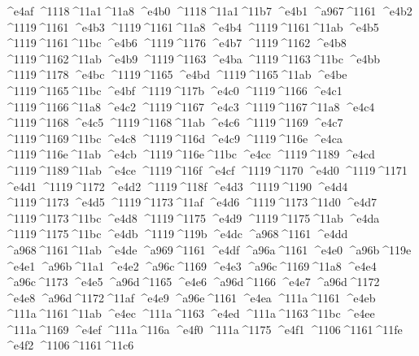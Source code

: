 \checkit ^^^^e4af ^^^^1118^^^^11a1^^^^11a8
\checkit ^^^^e4b0 ^^^^1118^^^^11a1^^^^11b7
\checkit ^^^^e4b1 ^^^^a967^^^^1161
\checkit ^^^^e4b2 ^^^^1119^^^^1161
\checkit ^^^^e4b3 ^^^^1119^^^^1161^^^^11a8
\checkit ^^^^e4b4 ^^^^1119^^^^1161^^^^11ab
\checkit ^^^^e4b5 ^^^^1119^^^^1161^^^^11bc
\checkit ^^^^e4b6 ^^^^1119^^^^1176
\checkit ^^^^e4b7 ^^^^1119^^^^1162
\checkit ^^^^e4b8 ^^^^1119^^^^1162^^^^11ab
\checkit ^^^^e4b9 ^^^^1119^^^^1163
\checkit ^^^^e4ba ^^^^1119^^^^1163^^^^11bc
\checkit ^^^^e4bb ^^^^1119^^^^1178
\checkit ^^^^e4bc ^^^^1119^^^^1165
\checkit ^^^^e4bd ^^^^1119^^^^1165^^^^11ab
\checkit ^^^^e4be ^^^^1119^^^^1165^^^^11bc
\checkit ^^^^e4bf ^^^^1119^^^^117b
\checkit ^^^^e4c0 ^^^^1119^^^^1166
\checkit ^^^^e4c1 ^^^^1119^^^^1166^^^^11a8
\checkit ^^^^e4c2 ^^^^1119^^^^1167
\checkit ^^^^e4c3 ^^^^1119^^^^1167^^^^11a8
\checkit ^^^^e4c4 ^^^^1119^^^^1168
\checkit ^^^^e4c5 ^^^^1119^^^^1168^^^^11ab
\checkit ^^^^e4c6 ^^^^1119^^^^1169
\checkit ^^^^e4c7 ^^^^1119^^^^1169^^^^11bc
\checkit ^^^^e4c8 ^^^^1119^^^^116d
\checkit ^^^^e4c9 ^^^^1119^^^^116e
\checkit ^^^^e4ca ^^^^1119^^^^116e^^^^11ab
\checkit ^^^^e4cb ^^^^1119^^^^116e^^^^11bc
\checkit ^^^^e4cc ^^^^1119^^^^1189
\checkit ^^^^e4cd ^^^^1119^^^^1189^^^^11ab
\checkit ^^^^e4ce ^^^^1119^^^^116f
\checkit ^^^^e4cf ^^^^1119^^^^1170
\checkit ^^^^e4d0 ^^^^1119^^^^1171
\checkit ^^^^e4d1 ^^^^1119^^^^1172
\checkit ^^^^e4d2 ^^^^1119^^^^118f
\checkit ^^^^e4d3 ^^^^1119^^^^1190
\checkit ^^^^e4d4 ^^^^1119^^^^1173
\checkit ^^^^e4d5 ^^^^1119^^^^1173^^^^11af
\checkit ^^^^e4d6 ^^^^1119^^^^1173^^^^11d0
\checkit ^^^^e4d7 ^^^^1119^^^^1173^^^^11bc
\checkit ^^^^e4d8 ^^^^1119^^^^1175
\checkit ^^^^e4d9 ^^^^1119^^^^1175^^^^11ab
\checkit ^^^^e4da ^^^^1119^^^^1175^^^^11bc
\checkit ^^^^e4db ^^^^1119^^^^119b
\checkit ^^^^e4dc ^^^^a968^^^^1161
\checkit ^^^^e4dd ^^^^a968^^^^1161^^^^11ab
\checkit ^^^^e4de ^^^^a969^^^^1161
\checkit ^^^^e4df ^^^^a96a^^^^1161
\checkit ^^^^e4e0 ^^^^a96b^^^^119e
\checkit ^^^^e4e1 ^^^^a96b^^^^11a1
\checkit ^^^^e4e2 ^^^^a96c^^^^1169
\checkit ^^^^e4e3 ^^^^a96c^^^^1169^^^^11a8
\checkit ^^^^e4e4 ^^^^a96c^^^^1173
\checkit ^^^^e4e5 ^^^^a96d^^^^1165
\checkit ^^^^e4e6 ^^^^a96d^^^^1166
\checkit ^^^^e4e7 ^^^^a96d^^^^1172
\checkit ^^^^e4e8 ^^^^a96d^^^^1172^^^^11af
\checkit ^^^^e4e9 ^^^^a96e^^^^1161
\checkit ^^^^e4ea ^^^^111a^^^^1161
\checkit ^^^^e4eb ^^^^111a^^^^1161^^^^11ab
\checkit ^^^^e4ec ^^^^111a^^^^1163
\checkit ^^^^e4ed ^^^^111a^^^^1163^^^^11bc
\checkit ^^^^e4ee ^^^^111a^^^^1169
\checkit ^^^^e4ef ^^^^111a^^^^116a
\checkit ^^^^e4f0 ^^^^111a^^^^1175
\checkit ^^^^e4f1 ^^^^1106^^^^1161^^^^11fe
\checkit ^^^^e4f2 ^^^^1106^^^^1161^^^^11c6
